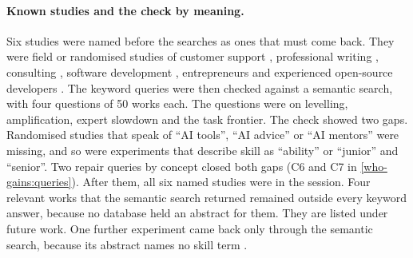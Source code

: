 \paragraph{Known studies and the check by meaning.}
Six studies were named before the searches as ones that must come back.
They were field or randomised studies of customer support
\autocite{Brynjolfsson2025Generative}, professional writing
\autocite{Noy2023Experimental}, consulting \autocite{DellAcqua2026Navigating},
software development \autocite{Cui2026Effects}, entrepreneurs
\autocite{Otis2026Uneven} and experienced open-source developers
\autocite{Becker2025Measuring}. The keyword queries were then checked
against a semantic search, with four questions of 50 works each. The
questions were on levelling, amplification, expert slowdown and the task
frontier. The check showed two gaps. Randomised studies that speak of
\enquote{AI tools}, \enquote{AI advice} or \enquote{AI mentors} were
missing, and so were experiments that describe skill as
\enquote{ability} or \enquote{junior} and \enquote{senior}. Two repair
queries by concept closed both gaps (C6 and C7 in
\cref{who-gains:queries}). After them, all six named studies were in the
session. Four relevant works that the semantic search returned remained
outside every keyword answer, because no database held an abstract for
them. They are listed under future work. One further experiment came
back only through the semantic search, because its abstract names no
skill term \autocite{Peng2023Impact}.

